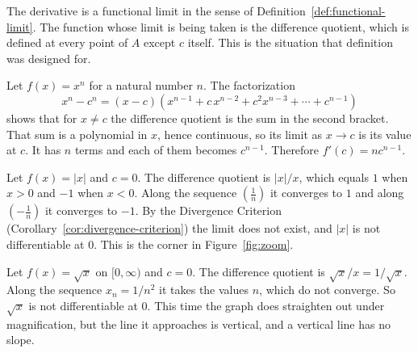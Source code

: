 \begin{marginfigure}
\centering
{}
\caption{Secant lines through the point above $c$.  As the second point slides down the curve toward the first, the secants turn toward the tangent.}
\end{marginfigure}

The derivative is a functional limit in the sense of Definition~\ref{def:functional-limit}.  The function whose limit is being taken is the difference quotient, which is defined at every point of $A$ except $c$ itself.  This is the situation that definition was designed for.

\begin{example}
Let $f(x) = x^n$ for a natural number $n$.  The factorization
\[ x^n - c^n = (x - c)\left(x^{n-1} + c\,x^{n-2} + c^2 x^{n-3} + \cdots + c^{n-1}\right) \]
shows that for $x \neq c$ the difference quotient is the sum in the second bracket.  That sum is a polynomial in $x$, hence continuous, so its limit as $x \to c$ is its value at $c$.  It has $n$ terms and each of them becomes $c^{n-1}$.  Therefore $f'(c) = n c^{n-1}$.
\end{example}

\begin{example}\label{ex:abs-not-diff}
Let $f(x) = |x|$ and $c = 0$.  The difference quotient is $|x|/x$, which equals $1$ when $x > 0$ and $-1$ when $x < 0$.  Along the sequence $\left(\frac1n\right)$ it converges to $1$ and along $\left(-\frac1n\right)$ it converges to $-1$.  By the Divergence Criterion (Corollary~\ref{cor:divergence-criterion}) the limit does not exist, and $|x|$ is not differentiable at $0$.  This is the corner in Figure~\ref{fig:zoom}.
\end{example}

\begin{example}
Let $f(x) = \sqrt{x}$ on $[0, \infty)$ and $c = 0$.  The difference quotient is $\sqrt{x}/x = 1/\sqrt{x}$.  Along the sequence $x_n = 1/n^2$ it takes the values $n$, which do not converge.  So $\sqrt{x}$ is not differentiable at $0$.  This time the graph does straighten out under magnification, but the line it approaches is vertical, and a vertical line has no slope.
\end{example}


